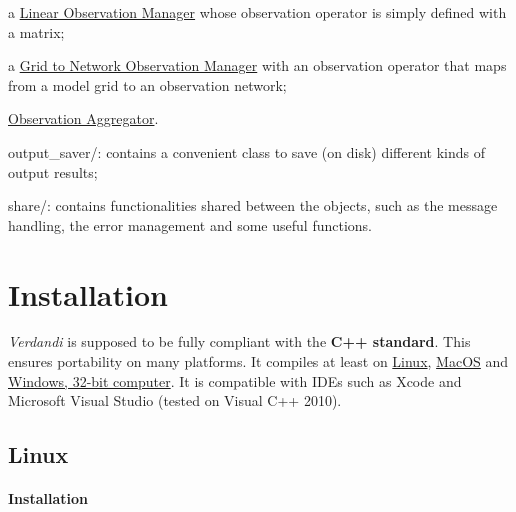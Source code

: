 \documentclass{tufte-book}
\begin{document}
\begin{DoxyItemize}
\begin{DoxyItemize}
\item a  \hyperlink{linear_observation_manager}{Linear Observation Manager} whose observation operator is simply defined with a matrix;
\item a  \hyperlink{grid_to_network_observation_manager}{Grid to Network Observation Manager} with an observation operator that maps from a model grid to an observation network;
\item  \hyperlink{observation_aggregator}{Observation Aggregator}.
\end{DoxyItemize}
\item {\ttfamily output\-\_\-saver/}\-: contains a convenient class to save (on disk) different kinds of output results;
\item {\ttfamily share/}\-: contains functionalities shared between the objects, such as the message handling, the error management and some useful functions.


\end{DoxyItemize}




\hypertarget{installation}{}\section{Installation}\label{installation}


\-\emph{Verdandi} is supposed to be fully compliant with the {\bfseries \-C++ standard}. \-This ensures portability on many platforms. \-It compiles at least on \hyperlink{installation_linux}{\-Linux}, \hyperlink{installation_macos}{\-Mac\-O\-S} and \hyperlink{installation_windows}{\-Windows, 32-\/bit computer}. \-It is compatible with \-I\-D\-Es such as \-Xcode and \-Microsoft \-Visual \-Studio (tested on \-Visual \-C++ 2010).



\hypertarget{installation_linux}{}\subsection{\-Linux}\label{installation_linux}



\hypertarget{installation_installation_linux}{}\paragraph{\-Installation}\label{installation_installation_linux}
\end{document}

